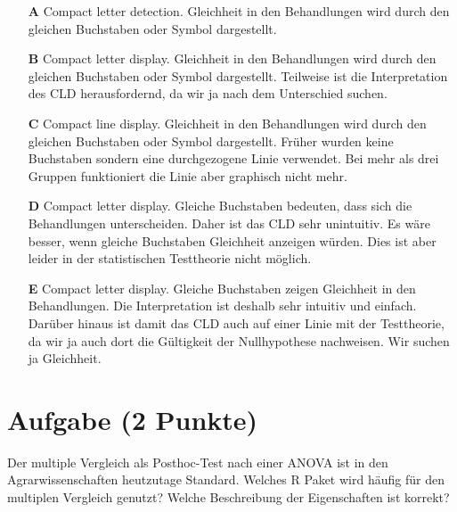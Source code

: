 \documentclass[a4paper, 9pt]{scrartcl}\usepackage[]{graphicx}\usepackage[]{xcolor}
\begin{document}
\begin{enumerate}
\item [\textbf{A} \msquare] Compact letter detection. Gleichheit in den Behandlungen wird durch den gleichen Buchstaben oder Symbol dargestellt.
\item [\textbf{B} \msquare] Compact letter display. Gleichheit in den Behandlungen wird durch den gleichen Buchstaben oder Symbol dargestellt. Teilweise ist die Interpretation des CLD herausfordernd, da wir ja nach dem Unterschied suchen.
\item [\textbf{C} \msquare] Compact line display. Gleichheit in den Behandlungen wird durch den gleichen Buchstaben oder Symbol dargestellt. Früher wurden keine Buchstaben sondern eine durchgezogene Linie verwendet. Bei mehr als drei Gruppen funktioniert die Linie aber graphisch nicht mehr.
\item [\textbf{D} \msquare] Compact letter display. Gleiche Buchstaben bedeuten, dass sich die Behandlungen unterscheiden. Daher ist das CLD sehr unintuitiv. Es wäre besser, wenn gleiche Buchstaben Gleichheit anzeigen würden. Dies ist aber leider in der statistischen Testtheorie nicht möglich.
\item [\textbf{E} \msquare] Compact letter display. Gleiche Buchstaben zeigen Gleichheit in den Behandlungen. Die Interpretation ist deshalb sehr intuitiv und einfach. Darüber hinaus ist damit das CLD auch auf einer Linie mit der Testtheorie, da wir ja auch dort die Gültigkeit der Nullhypothese nachweisen. Wir suchen ja Gleichheit.
\end{enumerate}

\section{Aufgabe \hfill (2 Punkte)}




Der multiple Vergleich als Posthoc-Test nach einer ANOVA ist in den Agrarwissenschaften heutzutage Standard. Welches R Paket wird häufig für den multiplen Vergleich genutzt? Welche Beschreibung der Eigenschaften ist korrekt?
\end{document}
